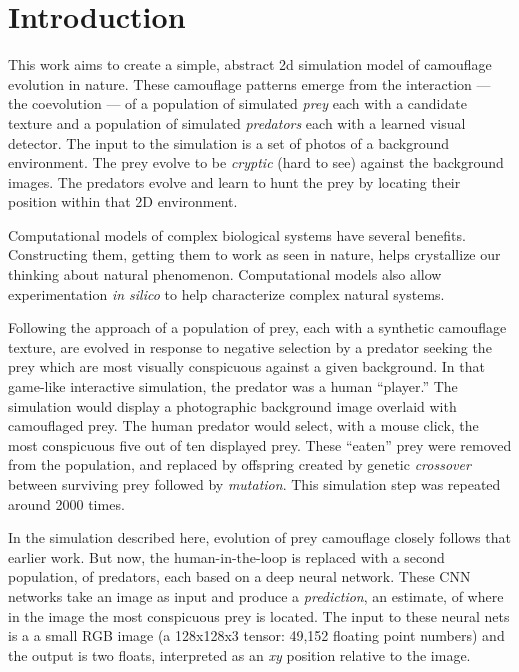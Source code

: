 \documentclass[sigconf]{acmart}
\newcommand{\jargon}[1]{\textit{#1}}
\begin{document}

\section{Introduction}
This work aims to create a simple, abstract 2d simulation model of camouflage evolution in nature. These camouflage patterns emerge from the interaction — the coevolution — of a population of simulated \textit{prey} each with a candidate texture and a population of simulated \textit{predators} each with a learned visual detector. The input to the simulation is a set of photos of a background environment. The prey evolve to be \textit{cryptic} (hard to see) against the background images. The predators evolve and learn to hunt the prey by locating their position within that 2D environment.
\par
Computational models of complex biological systems have several benefits. Constructing them, getting them to work as seen in nature, helps crystallize our thinking about natural phenomenon. Computational models also allow experimentation \textit{in silico} to help characterize complex natural systems.
\par
Following the approach of \citet{Reynolds2011} a population of prey, each with a synthetic camouflage texture, are evolved in response to negative selection by a predator seeking the prey which are most visually conspicuous against a given background. In that game-like interactive simulation, the predator was a human “player.” The simulation would display a photographic background image overlaid with camouflaged prey. The human predator would select, with a mouse click, the most conspicuous five out of ten displayed prey. These “eaten” prey were removed from the population, and replaced by offspring created by genetic \textit{crossover} between surviving prey followed by \textit{mutation}. This simulation step was repeated around 2000 times.
\par
In the simulation described here, evolution of prey camouflage closely follows that earlier work. But now, the human-in-the-loop is replaced with a second population, of predators, each based on a deep neural network. These CNN networks take an image as input and produce a \jargon{prediction}, an estimate, of where in the image the most conspicuous prey is located. The input to these neural nets is a a small RGB image (a 128x128x3 tensor: 49,152 floating point numbers) and the output is two floats, interpreted as an \textit{xy} position relative to the image. 
\end{document}
